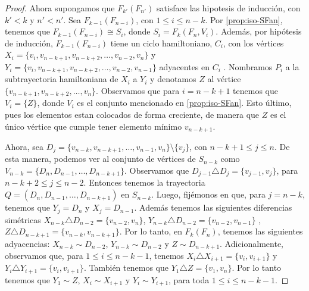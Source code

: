 \begin{proof}
            Ahora supongamos que $F_{k'}(F_{n'})$ satisface las hipotesis de
            inducci\'on, con $k'< k$ y $n'<n'$. 
            Sea $F_{k-1}(F_{n-i})$, con $1 \leq i \leq n-k$. Por
            \cref{prop:iso-SFan}, tenemos que $F_{k-1}(F_{n-i}) \cong S_i$,
            donde $S_i= F_k(F_n, V_i)$. Adem\'as, por hip\'otesis de
            inducci\'on, $F_{k-1}(F_{n-i})$ tiene un ciclo hamiltoniano, $C_i$,
            con los v\'ertices $X_i = \{v_i, v_{n-k+1}, v_{n-k+2}, \dots,
            v_{n-2}, v_n\}$ y $Y_i= \{v_i, v_{n-k+1}, v_{n-k+2}, \dots, v_{n-2},
            v_{n-1}\}$ adyacentes en $C_i$ . Nombramos $P_i$ a la subtrayectoria
            hamiltoniana de $X_i$ a $Y_i$ y denotamos $Z$ al v\'ertice
            $\{v_{n-k+1}, v_{n-k+2}, \dots, v_n\}$. Observamos que para $i=
            n-k+1$ tenemos que $V_i = \{Z\}$, donde $V_i$ es el conjunto
            mencionado en \cref{prop:iso-SFan}. Esto \'ultimo, pues los
            elementos estan colocados de forma creciente, de manera que $Z$ es
            el \'unico v\'ertice que cumple tener elemento m\'inimo $v_{n-k+1}$. 
    
            Ahora, sea $D_j =\{v_{n-k}, v_{n-k+1}, \dots, v_{n-1}, v_n\}
            \setminus \{v_j\}$, con $n-k+1 \leq j \leq n$.  De esta manera,
            podemos ver al conjunto de v\'ertices de $S_{n-k}$ como
            $V_{n-k}=\{D_n, D_{n-1}, \dots, D_{n-k+1}\}$. Observamos que
            $D_{j-1} \triangle D_j= \{v_{j-1}, v_j\}$, para $n-k+2 \leq j \leq
            n-2$. Entonces tenemos la trayectoria $Q= (D_n, D_{n-1}, \dots,
            D_{n-k+1})$ en $S_{n-k}$.     
            Luego, fij\'emonos en que, para $j= n-k$, tenemos que $Y_j = D_n$ y
            $X_j= D_{n-1}$. Adem\'as tenemos las siguientes diferencias
            sim\'etricas $X_{n-k}\triangle D_{n-2} =\{v_{n-2}, v_n\}$,
            $Y_{n-k}\triangle D_{n-2} =\{v_{n-2}, v_{n-1}\}$ , $Z\triangle
            D_{n-k+1} =\{v_{n-k}, v_{n-k+1}\}$. Por lo tanto, en $F_k(F_n)$,
            tenemos las siguientes adyacencias: $X_{n-k} \sim D_{n-2}$, $Y_{n-k}
            \sim D_{n-2}$ y $Z \sim D_{n-k+1}$. Adicionalmente, observamos que,
            para $1 \leq i \leq n- k- 1$, tenemos $X_{i} \triangle X_{i+1}=
            \{v_i, v_{i+1}\}$ y $Y_i \triangle Y_{i+1} = \{v_i, v_{i+1}\}$.
            Tambi\'en tenemos que $Y_1 \triangle Z = \{v_1, v_n\}$. Por lo tanto
            tenemos que $Y_1 \sim Z$, $X_i \sim X_{i+1}$ y $Y_i \sim Y_{i+1}$,
            para toda $1 \leq i \leq n-k-1$.
            

\end{proof}
